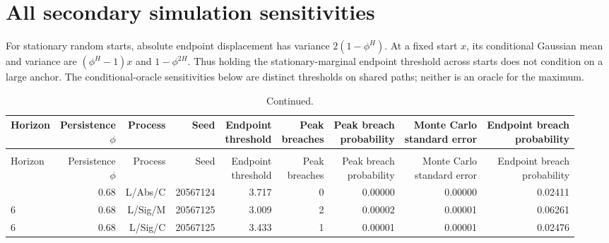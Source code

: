 \section{All secondary simulation sensitivities}\label{sup:simulation-secondary}

For stationary random starts, absolute endpoint displacement has
variance \(2(1-\phi^H)\). At a fixed start \(x\), its conditional Gaussian
mean and variance are \((\phi^H-1)x\) and \(1-\phi^{2H}\). Thus holding the
stationary-marginal endpoint threshold across starts does not condition on a
large anchor. The conditional-oracle sensitivities below are distinct thresholds
on shared paths; neither is an oracle for the maximum.
\begingroup
\footnotesize
\setlength{\tabcolsep}{3pt}
\renewcommand{\arraystretch}{1.12}
\begin{longtable}{lrrrrrrrr}
\caption{All secondary anchor and conditional-threshold sensitivities. Conditional and marginal endpoint calibration remain distinct.}\\
\toprule
Horizon & \shortstack{Persistence\\\(\phi\)} & Process & Seed & \shortstack{Endpoint\\threshold} & \shortstack{Peak\\breaches} & \shortstack{Peak breach\\probability} & \shortstack{Monte Carlo\\standard error} & \shortstack{Endpoint breach\\probability} \\
\midrule
\endfirsthead
\caption[]{Continued.}\\
\toprule
Horizon & \shortstack{Persistence\\\(\phi\)} & Process & Seed & \shortstack{Endpoint\\threshold} & \shortstack{Peak\\breaches} & \shortstack{Peak breach\\probability} & \shortstack{Monte Carlo\\standard error} & \shortstack{Endpoint breach\\probability} \\
\midrule
\endhead
\bottomrule
\endfoot
6 & 0.68 & L/Abs/C & 20567124 & 3.717 & 0 & 0.00000 & 0.00000 & 0.02411 \\
6 & 0.68 & L/Sig/M & 20567125 & 3.009 & 2 & 0.00002 & 0.00001 & 0.06261 \\
6 & 0.68 & L/Sig/C & 20567125 & 3.433 & 1 & 0.00001 & 0.00001 & 0.02476 \\

\end{longtable}

